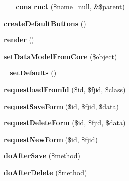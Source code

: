 \begin{DoxyCompactItemize}
\item 
\hypertarget{classwForm_aaaa7f4f4ddacfce6d6d085bd905d7aa4}{
{\bfseries \_\-\_\-construct} (\$name=null, \&\$parent)}
\label{classwForm_aaaa7f4f4ddacfce6d6d085bd905d7aa4}

\item 
\hypertarget{classwForm_a138cc0db418e51d3f4d1c750f5b17cd1}{
{\bfseries createDefaultButtons} ()}
\label{classwForm_a138cc0db418e51d3f4d1c750f5b17cd1}

\item 
\hypertarget{classwForm_a6e17b60d76e746a73bbd78ef285223ff}{
{\bfseries render} ()}
\label{classwForm_a6e17b60d76e746a73bbd78ef285223ff}

\item 
\hypertarget{classwForm_a8176f0c924f780deef3d61efb13dfb44}{
{\bfseries setDataModelFromCore} (\$object)}
\label{classwForm_a8176f0c924f780deef3d61efb13dfb44}

\item 
\hypertarget{classwForm_a9df1501b0be86c02cb3e3e3bee1c2636}{
{\bfseries \_\-setDefaults} ()}
\label{classwForm_a9df1501b0be86c02cb3e3e3bee1c2636}

\item 
\hypertarget{classwForm_a6e5785cda311a90bc8de041eeeda70a3}{
{\bfseries requestloadFromId} (\$id, \$fjid, \$class)}
\label{classwForm_a6e5785cda311a90bc8de041eeeda70a3}

\item 
\hypertarget{classwForm_a3f211d36d8d044c075f8a5a833504c0b}{
{\bfseries requestSaveForm} (\$id, \$fjid, \$data)}
\label{classwForm_a3f211d36d8d044c075f8a5a833504c0b}

\item 
\hypertarget{classwForm_a5b51cb0d43f95baa6b681daa21df1bba}{
{\bfseries requestDeleteForm} (\$id, \$fjid, \$data)}
\label{classwForm_a5b51cb0d43f95baa6b681daa21df1bba}

\item 
\hypertarget{classwForm_a8d56069f01d853007f060d94edb4968e}{
{\bfseries requestNewForm} (\$id, \$fjid)}
\label{classwForm_a8d56069f01d853007f060d94edb4968e}

\item 
\hypertarget{classwForm_a7270b4f28aa9961f880b8a70e6fbcc67}{
{\bfseries doAfterSave} (\$method)}
\label{classwForm_a7270b4f28aa9961f880b8a70e6fbcc67}

\item 
\hypertarget{classwForm_ad028831ef99607be062ee095b0ac18f3}{
{\bfseries doAfterDelete} (\$method)}
\label{classwForm_ad028831ef99607be062ee095b0ac18f3}

\end{DoxyCompactItemize}
